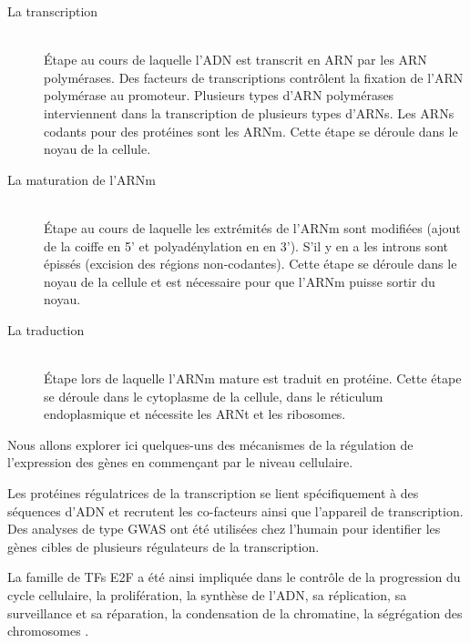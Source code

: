       \begin{description}
          \item [La transcription]              \hfill \\
            Étape au cours de laquelle l'\acs{ADN} est transcrit en \acs{ARN} par les \acs{ARN} polymérases.
            Des facteurs de transcriptions contrôlent la fixation de l'\acs{ARN} polymérase au promoteur.
            Plusieurs types d'\acs{ARN} polymérases interviennent dans la transcription de plusieurs types d'\acsp{ARN}.
            Les \acsp{ARN} codants pour des protéines sont les \acs{ARNm}.
            Cette étape se déroule dans le noyau de la cellule.
          \item [La maturation de l'\acs{ARNm}] \hfill \\
            Étape au cours de laquelle les extrémités de l'\acs{ARNm} sont modifiées (ajout de la coiffe en 5' et polyadénylation en en 3').
            S'il y en a les introns sont épissés (excision des régions non-codantes).
            Cette étape se déroule dans le noyau de la cellule et est nécessaire pour que l'\acs{ARNm} puisse sortir du noyau.
          \item [La traduction]                 \hfill \\
            Étape lors de laquelle l'\acs{ARNm} mature est traduit en protéine.
            Cette étape se déroule dans le cytoplasme de la cellule, dans le réticulum endoplasmique et nécessite les \acs{ARNt} et les ribosomes.
      \end{description}
      \vspace{1.5ex}

      Nous allons explorer ici quelques-uns des mécanismes de la régulation de l'expression des gènes en commençant par le niveau cellulaire.

      Les protéines régulatrices de la transcription se lient spécifiquement à des séquences d'\acs{ADN} et recrutent les co-facteurs ainsi que l'appareil de transcription.
      Des analyses de type \ac{GWAS} ont été utilisées chez l'humain pour identifier les gènes cibles de plusieurs régulateurs de la transcription.
      \pagebreak

      La famille de \acp{TF} \acs{E2F} a été ainsi impliquée dans le contrôle de la progression du cycle cellulaire, la prolifération, la synthèse de l'\acs{ADN}, sa réplication, sa surveillance et sa réparation, la condensation de la chromatine, la ségrégation des chromosomes \citep{Ren2002}.

